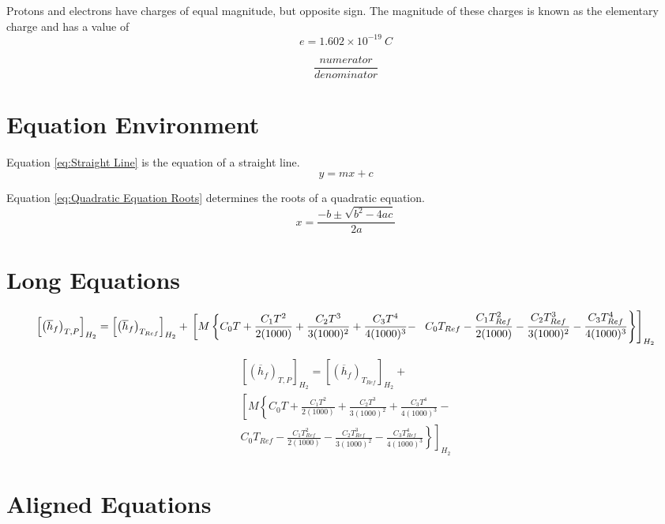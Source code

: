 \documentclass[]{report}
\begin{document}
Protons and electrons have charges of equal magnitude, but opposite sign. The magnitude of these charges is known as the elementary charge and has a value of $$e=1.602\times 10^{-19}\ C$$

$$\frac{numerator}{denominator}$$

\section{Equation Environment}

Equation \ref{eq:Straight Line} is the equation of a straight line.
\begin{equation} \label{eq:Straight Line}
y=mx+c
\end{equation}

Equation \ref{eq:Quadratic Equation Roots} determines the roots of a quadratic equation.
\begin{equation} \label{eq:Quadratic Equation Roots}
x=\frac{-b\pm \sqrt{b^2-4ac}}{2a}
\end{equation}

\section{Long Equations}

\begin{equation}
\left[ \left( \overline{h}_f \right)_{T,P} \right]_{H_2} = \left[ \left( \overline{h}_f \right)_{T_{Ref}} \right]_{H_2} + \\
\left[M \left\{ C_0T + \frac{C_1T^2}{2(1000)} + \frac{C_2T^3}{3(1000)^2} + \frac{C_3T^4}{4(1000)^3} - \right.\right. \\
\left.\left. C_0T_{Ref} - \frac{C_1T_{Ref}^2}{2(1000)} - \frac{C_2T_{Ref}^3}{3(1000)^2} - \frac{C_3T_{Ref}^4}{4(1000)^3} \right\} \right]_{H_2}
\end{equation}

\begin{multline}
\left[ \left( \overline{h}_f \right)_{T,P} \right]_{H_2} = \left[ \left( \overline{h}_f \right)_{T_{Ref}} \right]_{H_2} + \\
\left[M \left\{ C_0T + \frac{C_1T^2}{2(1000)} + \frac{C_2T^3}{3(1000)^2} + \frac{C_3T^4}{4(1000)^3} - \right.\right. \\
\left.\left. C_0T_{Ref} - \frac{C_1T_{Ref}^2}{2(1000)} - \frac{C_2T_{Ref}^3}{3(1000)^2} - \frac{C_3T_{Ref}^4}{4(1000)^3} \right\} \right]_{H_2}
\end{multline}

\section{Aligned Equations}
\end{document}
